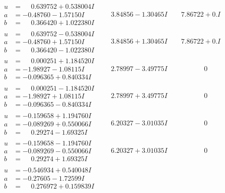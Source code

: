 \documentclass[1p]{elsarticle_modified}
\theoremstyle{definition}
\begin{document}
$$\begin{array}{c|c|c}
\begin{aligned}
u &= \phantom{-}0.639752 + 0.538004 I \\
a &= -0.48760 - 1.57150 I \\
b &= \phantom{-}0.366420 + 1.022380 I\end{aligned}
 & \phantom{-}3.84856 - 1.30465 I & \phantom{-}7.86722 + 0. I\phantom{ +0.000000I} \\ \hline\begin{aligned}
u &= \phantom{-}0.639752 - 0.538004 I \\
a &= -0.48760 + 1.57150 I \\
b &= \phantom{-}0.366420 - 1.022380 I\end{aligned}
 & \phantom{-}3.84856 + 1.30465 I & \phantom{-}7.86722 + 0. I\phantom{ +0.000000I} \\ \hline\begin{aligned}
u &= \phantom{-}0.000251 + 1.184520 I \\
a &= -1.98927 - 1.08115 I \\
b &= -0.096365 + 0.840334 I\end{aligned}
 & \phantom{-}2.78997 - 3.49775 I & \phantom{-0.000000 } 0 \\ \hline\begin{aligned}
u &= \phantom{-}0.000251 - 1.184520 I \\
a &= -1.98927 + 1.08115 I \\
b &= -0.096365 - 0.840334 I\end{aligned}
 & \phantom{-}2.78997 + 3.49775 I & \phantom{-0.000000 } 0 \\ \hline\begin{aligned}
u &= -0.159658 + 1.194760 I \\
a &= -0.089269 + 0.550066 I \\
b &= \phantom{-}0.29274 - 1.69325 I\end{aligned}
 & \phantom{-}6.20327 - 3.01035 I & \phantom{-0.000000 } 0 \\ \hline\begin{aligned}
u &= -0.159658 - 1.194760 I \\
a &= -0.089269 - 0.550066 I \\
b &= \phantom{-}0.29274 + 1.69325 I\end{aligned}
 & \phantom{-}6.20327 + 3.01035 I & \phantom{-0.000000 } 0 \\ \hline\begin{aligned}
u &= -0.546934 + 0.540048 I \\
a &= -0.27605 - 1.72599 I \\
b &= \phantom{-}0.276972 + 0.159839 I\end{aligned}

\end{array}$$
\end{document}

